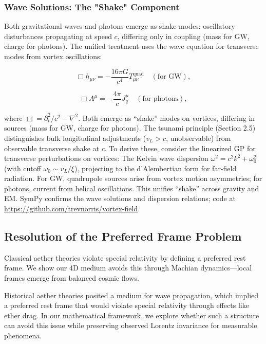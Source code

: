 \subsubsection{Wave Solutions: The "Shake" Component}

Both gravitational waves and photons emerge as shake modes: oscillatory disturbances propagating at speed $c$, differing only in coupling (mass for GW, charge for photons). The unified treatment uses the wave equation for transverse modes from vortex oscillations:

\begin{equation}
\Box h_{\mu\nu} = -\frac{16\pi G}{c^4} T_{\mu\nu}^{\text{quad}} \quad (\text{for GW}),
\end{equation}

\begin{equation}
\Box A^\mu = -\frac{4\pi}{c} J_q^\mu \quad (\text{for photons}),
\end{equation}

where $\Box = \partial_t^2 / c^2 - \nabla^2$. Both emerge as ``shake'' modes on vortices, differing in sources (mass for GW, charge for photons). The tsunami principle (Section 2.5) distinguishes bulk longitudinal adjustments ($v_L > c$, unobservable) from observable transverse shake at $c$. To derive these, consider the linearized GP for transverse perturbations on vortices: The Kelvin wave dispersion $\omega^2 = c^2 k^2 + \omega_0^2$ (with cutoff $\omega_0 \sim v_L / \xi$), projecting to the d'Alembertian form for far-field radiation. For GW, quadrupole sources arise from vortex motion asymmetries; for photons, current from helical oscillations. This unifies ``shake'' across gravity and EM. SymPy confirms the wave solutions and dispersion relations; code at \url{https://github.com/trevnorris/vortex-field}.

\subsection{Resolution of the Preferred Frame Problem}

Classical aether theories violate special relativity by defining a preferred rest frame. We show our 4D medium avoids this through Machian dynamics---local frames emerge from balanced cosmic flows.

Historical aether theories posited a medium for wave propagation, which implied a preferred rest frame that would violate special relativity through effects like ether drag. In our mathematical framework, we explore whether such a structure can avoid this issue while preserving observed Lorentz invariance for measurable phenomena.

